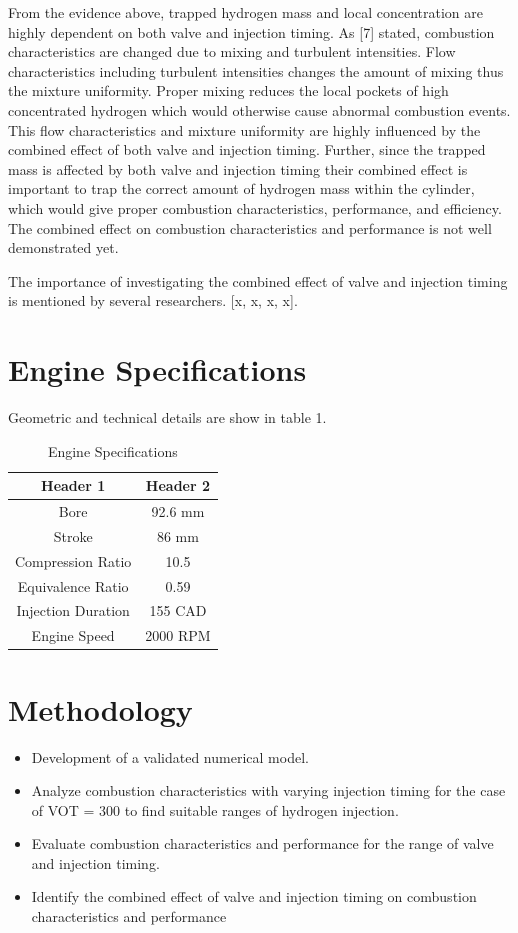 \documentclass[conference]{IEEEtran}
\begin{document}
From the evidence above, trapped hydrogen mass and local concentration are highly dependent on both valve and injection timing. As [7] stated, combustion characteristics are changed due to mixing and turbulent intensities. Flow characteristics including turbulent intensities changes the amount of mixing thus the mixture uniformity. Proper mixing reduces the local pockets of high concentrated hydrogen which would otherwise cause abnormal combustion events.
This flow characteristics and mixture uniformity are highly influenced by the combined effect of both valve and injection timing. Further, since the trapped mass is affected by both valve and injection timing their combined effect is important to trap the correct amount of hydrogen mass within the cylinder, which would give proper combustion characteristics, performance, and efficiency. The combined effect on combustion characteristics and performance is not well demonstrated yet.

The importance of investigating the combined effect of valve and injection timing is mentioned by several researchers. [x, x, x, x].

\section{Engine Specifications}
Geometric and technical details are show in table 1.
\begin{table}[!ht]
    \centering
    \caption{Engine Specifications}
    \label{your_label_here}
    \begin{tabular}{|c|c|}
    \hline
    Header 1 & Header 2 \\
    \hline
    Bore & 92.6 mm \\
    Stroke & 86 mm \\
    Compression Ratio & 10.5 \\
    Equivalence Ratio & 0.59 \\
    Injection Duration & 155 CAD \\
    Engine Speed & 2000 RPM \\
    \hline
    \end{tabular}
    \end{table}

\section{Methodology}
\begin{itemize}
    \item Development of a validated numerical model.
    \item Analyze combustion characteristics with varying injection timing for the case of VOT = 300 to find suitable ranges of hydrogen injection.
    \item Evaluate combustion characteristics and performance for the range of valve and injection timing.
    \item Identify the combined effect of valve and injection timing on combustion characteristics and performance
\end{itemize}
\end{document}
